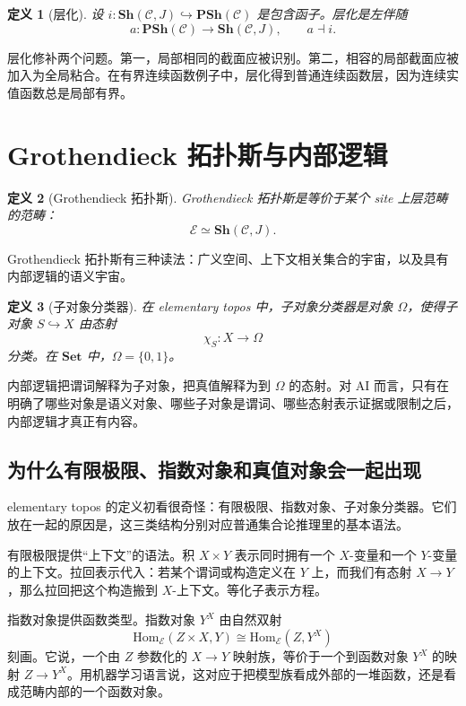 \documentclass[UTF8,11pt,fontset=none]{ctexart}
\newtheorem{definition}{定义}[section]
\newcommand{\Set}{\mathbf{Set}}
\newcommand{\PSh}{\mathbf{PSh}}
\newcommand{\Sh}{\mathbf{Sh}}
\newcommand{\Hom}{\mathrm{Hom}}
\begin{document}
\begin{definition}[层化]
设 \(i:\Sh(\mathcal C,J)\hookrightarrow \PSh(\mathcal C)\) 是包含函子。层化是左伴随
\[
a:\PSh(\mathcal C)\to \Sh(\mathcal C,J),
\qquad
a\dashv i.
\]
\end{definition}

层化修补两个问题。第一，局部相同的截面应被识别。第二，相容的局部截面应被加入为全局粘合。在有界连续函数例子中，层化得到普通连续函数层，因为连续实值函数总是局部有界。

\section{Grothendieck 拓扑斯与内部逻辑}

\begin{definition}[Grothendieck 拓扑斯]
Grothendieck 拓扑斯是等价于某个 site 上层范畴的范畴：
\[
\mathcal E\simeq \Sh(\mathcal C,J).
\]
\end{definition}

Grothendieck 拓扑斯有三种读法：广义空间、上下文相关集合的宇宙，以及具有内部逻辑的语义宇宙。

\begin{definition}[子对象分类器]
在 elementary topos 中，子对象分类器是对象 \(\Omega\)，使得子对象 \(S\hookrightarrow X\) 由态射
\[
\chi_S:X\to\Omega
\]
分类。在 \(\Set\) 中，\(\Omega=\{0,1\}\)。
\end{definition}

内部逻辑把谓词解释为子对象，把真值解释为到 \(\Omega\) 的态射。对 AI 而言，只有在明确了哪些对象是语义对象、哪些子对象是谓词、哪些态射表示证据或限制之后，内部逻辑才真正有内容。

\subsection{为什么有限极限、指数对象和真值对象会一起出现}

elementary topos 的定义初看很奇怪：有限极限、指数对象、子对象分类器。它们放在一起的原因是，这三类结构分别对应普通集合论推理里的基本语法。

有限极限提供“上下文”的语法。积 \(X\times Y\) 表示同时拥有一个 \(X\)-变量和一个 \(Y\)-变量的上下文。拉回表示代入：若某个谓词或构造定义在 \(Y\) 上，而我们有态射 \(X\to Y\)，那么拉回把这个构造搬到 \(X\)-上下文。等化子表示方程。

指数对象提供函数类型。指数对象 \(Y^X\) 由自然双射
\[
\Hom_{\mathcal E}(Z\times X,Y)\cong \Hom_{\mathcal E}(Z,Y^X)
\]
刻画。它说，一个由 \(Z\) 参数化的 \(X\to Y\) 映射族，等价于一个到函数对象 \(Y^X\) 的映射 \(Z\to Y^X\)。用机器学习语言说，这对应于把模型族看成外部的一堆函数，还是看成范畴内部的一个函数对象。
\end{document}
